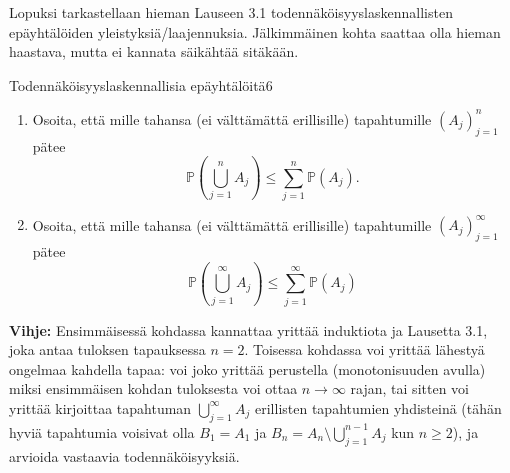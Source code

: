 \documentclass[11pt,a4paper]{amsart}
\newcommand{\1}{\mathbf{1}}
\renewcommand{\P}{\mathbb P}
\begin{document}
Lopuksi tarkastellaan hieman Lauseen 3.1 todennäköisyyslaskennallisten epäyhtälöiden yleistyksiä/laajennuksia. Jälkimmäinen kohta saattaa olla hieman haastava, mutta ei kannata säikähtää sitäkään.
\begin{Exercises}{Todennäköisyyslaskennallisia epäyhtälöitä}{6}
\begin{enumerate}
\item Osoita, että mille tahansa (ei välttämättä erillisille) tapahtumille $(A_j)_{j=1}^n$ pätee
\[
\P\left(\bigcup_{j=1}^n A_j\right)\leq \sum_{j=1}^n \P(A_j).
\]
\item Osoita, että mille tahansa (ei välttämättä erillisille) tapahtumille $(A_j)_{j=1}^\infty$ pätee 
\[
\P\left(\bigcup_{j=1}^\infty A_j\right)\leq \sum_{j=1}^\infty \P(A_j)
\]
\end{enumerate}

{\bf Vihje:} Ensimmäisessä kohdassa kannattaa yrittää induktiota ja Lausetta 3.1, joka antaa tuloksen tapauksessa $n=2$. Toisessa kohdassa voi yrittää lähestyä ongelmaa kahdella tapaa: voi joko yrittää perustella (monotonisuuden avulla) miksi ensimmäisen kohdan tuloksesta voi ottaa $n\to \infty$ rajan, tai sitten voi yrittää kirjoittaa tapahtuman $\bigcup_{j=1}^\infty A_j$ erillisten tapahtumien yhdisteinä (tähän hyviä tapahtumia voisivat olla $B_1=A_1$ ja $B_n=A_n\setminus \bigcup_{j=1}^{n-1}A_j$ kun $n\geq 2$), ja arvioida vastaavia todennäköisyyksiä.
\end{Exercises}
\end{document}
